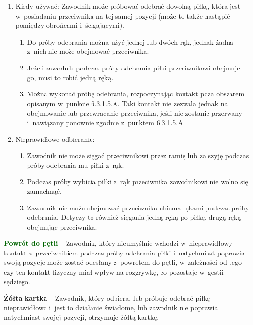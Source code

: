 \documentclass[12pt,a4paper]{article}
\newcommand\yellowcard[1]{\bgroup\textcolor{darkyellow}{\textbf{#1}}}
\newcommand\other[1]{\bgroup\textcolor{darkgreen}{\textbf{#1}}}
\begin{document}
\begin{enumerate}
	\item
	      Kiedy używać: Zawodnik może próbować odebrać dowolną piłkę, która jest
	      w~posiadaniu przeciwnika na tej samej pozycji (może to także nastąpić
	      pomiędzy obrońcami i~ścigającymi).

	      \begin{enumerate}
		      \item
		            Do próby odebrania można użyć jednej lub dwóch rąk, jednak żadna z~nich nie może obejmować przeciwnika.
		      \item
		            Jeżeli zawodnik podczas próby odebrania piłki przeciwnikowi obejmuje
		            go, musi to robić jedną ręką.
		      \item
		            Można wykonać próbę odebrania, rozpoczynając kontakt poza obszarem
		            opisanym w~punkcie 6.3.1.5.A. Taki kontakt nie zezwala jednak na
		            obejmowanie lub przewracanie przeciwnika, jeśli nie zostanie
		            przerwany i~nawiązany ponownie zgodnie z~punktem 6.3.1.5.A.
	      \end{enumerate}
	\item
	      Nieprawidłowe odbieranie:

	      \begin{enumerate}
		      \item
		            Zawodnik nie może sięgać przeciwnikowi przez ramię lub za szyję
		            podczas próby odebrania mu piłki z~rąk.
		      \item
		            Podczas próby wybicia piłki z~rąk przeciwnika zawodnikowi nie wolno
		            się zamachnąć.
		      \item
		            Zawodnik nie może obejmować przeciwnika obiema rękami podczas próby
		            odebrania. Dotyczy to również sięgania jedną ręką po piłkę, drugą
		            ręką obejmując przeciwnika.
	      \end{enumerate}
\end{enumerate}

\other{Powrót do pętli} -- Zawodnik, który nieumyślnie wchodzi w~nieprawidłowy kontakt z~przeciwnikiem podczas próby odebrania piłki i~natychmiast poprawia swoją pozycje może zostać odesłany z~powrotem do
pętli, w~zależności od tego czy ten kontakt fizyczny miał wpływ na
rozgrywkę, co pozostaje w~gestii sędziego.

\yellowcard{Żółta kartka} -- Zawodnik, który odbiera, lub próbuje odebrać piłkę
nieprawidłowo i~jest to działanie świadome, lub zawodnik nie poprawia
natychmiast swojej pozycji, otrzymuje żółtą kartkę.
\end{document}
